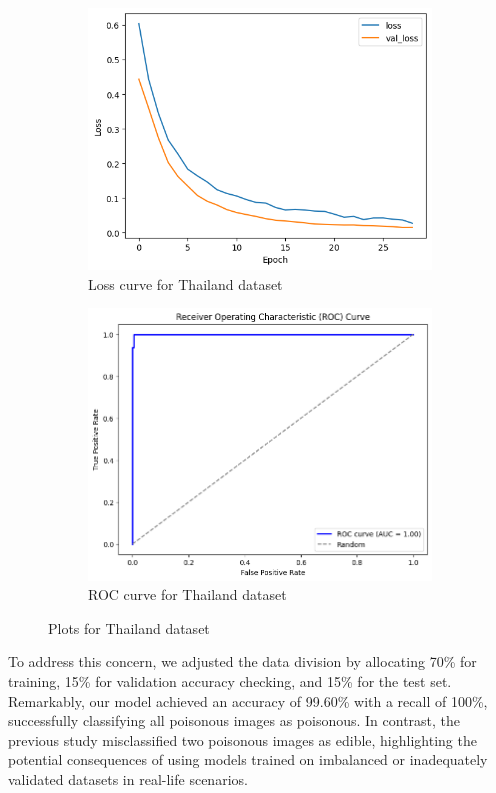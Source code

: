 \begin{figure}[!ht]
    \begin{subfigure}{0.45\textwidth}
        \centering
        \includegraphics[width=\linewidth]{images/thai.loss.png}
        \caption{Loss curve for Thailand dataset}
    \end{subfigure}
    \hfill
    \begin{subfigure}{0.45\textwidth}
        \centering
        \includegraphics[width=\linewidth]{images/thai.roc.png}
        \caption{ROC curve for Thailand dataset}
    \end{subfigure}
    
    \caption{Plots for Thailand dataset}
\end{figure}

To address this concern, we adjusted the data division by allocating 70\% for training, 15\% for validation accuracy checking, and 15\% for the test set. Remarkably, our model achieved an accuracy of 99.60\% with a recall of 100\%, successfully classifying all poisonous images as poisonous. In contrast, the previous study misclassified two poisonous images as edible, highlighting the potential consequences of using models trained on imbalanced or inadequately validated datasets in real-life scenarios.

